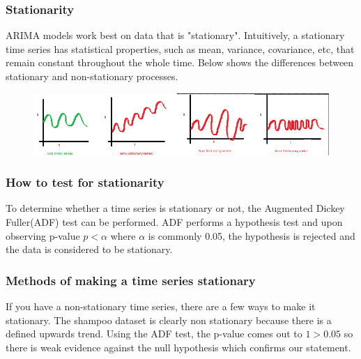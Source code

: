 \documentclass{article}
\begin{document}
  \subsubsection{Stationarity}
    ARIMA models work best on data that is "stationary". Intuitively, a stationary time series has statistical properties, such as mean, variance, covariance, etc, that remain constant throughout the whole time.
    Below shows the differences between stationary and non-stationary processes.
    \begin{figure}[H]
      \centering
      \includegraphics[scale=0.8]{stationary_time_series.png}
    \end{figure}

  \subsubsection{How to test for stationarity}
    To determine whether a time series is stationary or not, the Augmented Dickey Fuller(ADF) test can be performed. ADF performs a hypothesis test and upon observing p-value $p < \alpha$ where $\alpha$ is commonly 0.05, the hypothesis is rejected and the data is considered to be stationary.

  \subsubsection{Methods of making a time series stationary}
    If you have a non-stationary time series, there are a few ways to make it stationary. The shampoo dataset is clearly non stationary because there is a defined upwards trend. Using the ADF test, the p-value comes out to $1>0.05$ so there is weak evidence against the null hypothesis which confirms our statement.
\end{document}
